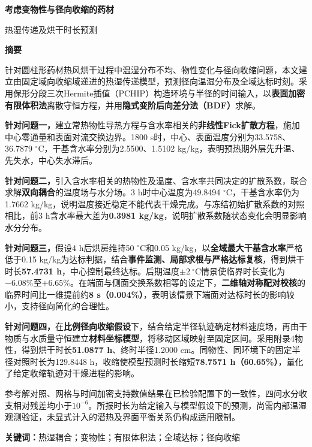 \begin{center}
{\fontsize{18}{24}\selectfont\bfseries 考虑变物性与径向收缩的药材\par 热湿传递及烘干时长预测}\par
\vspace{0.7em}
{\large\bfseries 摘\quad 要}
\end{center}
\noindent\hspace*{\parindent}%
针对圆柱形药材热风烘干过程中温湿分布不均、物性变化与径向收缩问题，本文建立由固定域向收缩域递进的热湿传递模型，预测径向温湿分布及全域达标时刻。采用保形分段三次Hermite插值（PCHIP）构造环境与半径的时间输入，以\textbf{表面加密有限体积法}离散守恒方程，并用\textbf{隐式变阶后向差分法（BDF）}求解。

\textbf{针对问题一，}建立常热物性导热方程与含水率相关的\textbf{非线性Fick扩散方程}，施加中心零通量和表面对流交换边界。1800 s时，中心、表面温度分别为33.5758、36.7879 $^\circ$C，干基含水率分别为2.5500、1.5102 kg/kg，表明预热期外层先升温、先失水，中心失水滞后。

\textbf{针对问题二，}引入含水率相关的热物性及温度、含水率共同决定的扩散系数，联合求解\textbf{双向耦合}的温度场与水分场。3 h时中心温度为49.8494 $^\circ$C，干基含水率仍为1.7662 kg/kg，说明温度接近稳定不能代表干燥完成。与冻结初始扩散系数的对照相比，前3 h含水率最大差为\textbf{0.3981 kg/kg}，说明扩散系数随状态变化会明显影响水分分布。

\textbf{针对问题三，}假设4 h后烘房维持50 $^\circ$C和0.05 kg/kg，以\textbf{全域最大干基含水率}严格低于0.15 kg/kg为达标判据，结合\textbf{事件监测、局部求根与严格达标复核}，得到烘干时长\textbf{57.4731 h}，中心控制最终达标。后期温度$\pm2\ ^\circ$C情景使临界时长变化为$-6.08\%$至$+6.65\%$。在端面与侧面交换系数相等的设定下，\textbf{二维轴对称配对校核}的临界时间比一维提前约\textbf{8 s（0.004\%）}，表明该情景下端面对达标时长的影响较小，支持径向简化的合理性。

\textbf{针对问题四，}在\textbf{比例径向收缩假设}下，结合给定半径轨迹确定材料速度场，再由干物质与水质量守恒建立\textbf{材料坐标模型}，将移动区域映射至固定区间。采用附录4物性，得到烘干时长\textbf{51.0877 h}、终时半径1.2000 cm。同物性、同环境下的固定半径对照时长为129.8448 h，收缩使模型预测时长缩短\textbf{78.7571 h（60.65\%）}，量化了给定收缩轨迹对干燥进程的影响。

参考解对照、网格与时间加密支持数值结果在已检验配置下的一致性，四问水分收支相对残差均小于$10^{-6}$。所报时长为给定输入与模型假设下的预测，尚需内部温湿观测验证，未显式计入的潜热及界面平衡关系仍构成适用限制。

\vspace{0.5em}
\noindent\textbf{关键词：}热湿耦合；变物性；有限体积法；全域达标；径向收缩
